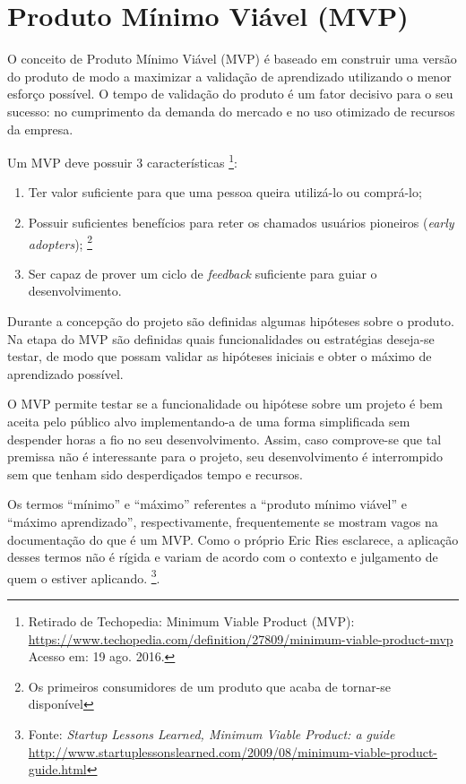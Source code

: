 \section{Produto Mínimo Viável (MVP)}
	\par O conceito de Produto Mínimo Viável (MVP) é baseado em construir uma versão do produto de modo a maximizar a validação de aprendizado utilizando o menor esforço possível. O tempo de validação do produto é um fator decisivo para o seu sucesso: no cumprimento da demanda do mercado e no uso otimizado de recursos da empresa. \citep{ries:11}
    \par Um MVP deve possuir 3 características \footnote{ Retirado de Techopedia: Minimum Viable Product (MVP): \url{https://www.techopedia.com/definition/27809/minimum-viable-product-mvp} Acesso em: 19 ago. 2016.}:
    \begin{enumerate}
        \item Ter valor suficiente para que uma pessoa queira utilizá-lo ou comprá-lo;
        \item Possuir suficientes benefícios para reter os chamados usuários pioneiros (\emph{early adopters}); \footnote{Os primeiros consumidores de um produto que acaba de tornar-se disponível}
        \item Ser capaz de prover um ciclo de \emph{feedback} suficiente para guiar o desenvolvimento.
\end{enumerate}
    \par Durante a concepção do projeto são definidas algumas hipóteses sobre o produto. Na etapa do MVP são definidas quais funcionalidades ou estratégias deseja-se testar, de modo que possam validar as hipóteses iniciais e obter o máximo de aprendizado possível.
    \par O MVP permite testar se a funcionalidade ou hipótese sobre um projeto é bem aceita pelo público alvo implementando-a de uma forma simplificada sem despender horas a fio no seu desenvolvimento. Assim, caso comprove-se que tal premissa não é interessante para o projeto, seu desenvolvimento é interrompido sem que tenham sido desperdiçados tempo e recursos.
    \par Os termos ``mínimo'' e ``máximo'' referentes a ``produto mínimo viável'' e ``máximo aprendizado'', respectivamente, frequentemente se mostram vagos na documentação do que é um MVP. Como o próprio Eric Ries esclarece, a aplicação desses termos não é rígida e variam de acordo com o contexto e julgamento de quem o estiver aplicando. \footnote{Fonte: \emph{Startup Lessons Learned, Minimum Viable Product: a guide} \url{http://www.startuplessonslearned.com/2009/08/minimum-viable-product-guide.html}}.
